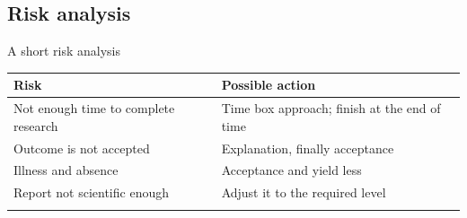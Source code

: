 \subsection{Risk analysis}
A short risk analysis
\begin{center}
\begin{tabular}{||l | l ||} 
 \hline
 \textbf{Risk} & \textbf{Possible action} \\ [0.5ex] 
 \hline\hline
 Not enough time to complete research & Time box approach; finish at the end of time \\ 
 \hline
 Outcome is not accepted & Explanation, finally acceptance \\
 \hline
 Illness and absence & Acceptance and yield less \\
 \hline
 Report not scientific enough & Adjust it to the required level \\
 \hline
 &   \\ [1ex] 
 \hline
\end{tabular}
\end{center}

